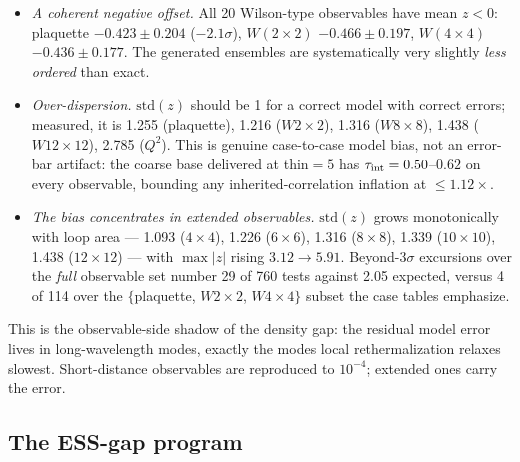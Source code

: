 \begin{itemize}
  \item \emph{A coherent negative offset.} All 20 Wilson-type observables
    have mean $z < 0$: plaquette $-0.423 \pm 0.204$ ($-2.1\sigma$),
    $W(2\times2)$ $-0.466 \pm 0.197$, $W(4\times4)$ $-0.436 \pm 0.177$. The
    generated ensembles are systematically very slightly \emph{less ordered}
    than exact.
  \item \emph{Over-dispersion.} $\mathrm{std}(z)$ should be 1 for a correct
    model with correct errors; measured, it is 1.255 (plaquette), 1.216
    ($W2{\times}2$), 1.316 ($W8{\times}8$), 1.438 ($W12{\times}12$), 2.785
    ($Q^2$). This is genuine case-to-case model bias, not an error-bar
    artifact: the coarse base delivered at thin${=}5$ has
    $\tau_{\rm int} = 0.50$--$0.62$ on every observable, bounding any
    inherited-correlation inflation at ${\le}1.12\times$.
  \item \emph{The bias concentrates in extended observables.}
    $\mathrm{std}(z)$ grows monotonically with loop area --- 1.093
    ($4{\times}4$), 1.226 ($6{\times}6$), 1.316 ($8{\times}8$), 1.339
    ($10{\times}10$), 1.438 ($12{\times}12$) --- with $\max|z|$ rising
    $3.12 \to 5.91$. Beyond-$3\sigma$ excursions over the \emph{full}
    observable set number 29 of 760 tests against 2.05 expected, versus 4 of
    114 over the $\{$plaquette, $W2{\times}2$, $W4{\times}4\}$ subset the
    case tables emphasize.
\end{itemize}

This is the observable-side shadow of the density gap: the residual model
error lives in long-wavelength modes, exactly the modes local
rethermalization relaxes slowest. Short-distance observables are reproduced
to $10^{-4}$; extended ones carry the error.

\subsection{The ESS-gap program}
\label{sec:appendix-v2-ess}

